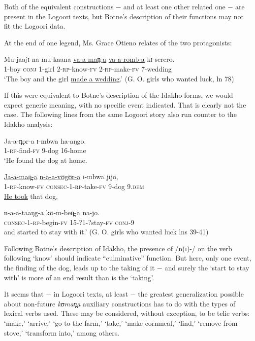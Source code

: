 \documentclass[output=paper]{langsci/langscibook}
\begin{document}
Both of the equivalent constructions $-$ and at least one other related one $-$ are present in the Logoori texts, but Botne’s description of their functions may not fit the Logoori data.

At the end of one legend, Ms. Grace Otieno relates of the two protagonists:

\ea\label{ex:sarvasy:26}
\gll Mu-jaajɪ   na   mu-kaana   \underline{va-a-man̪-a}   \underline{va-a-romb-a}     kɪ-serero. \\
1-boy    \textsc{conj}  1-girl    2-\textsc{rp}{}-know-\textsc{fv}  2-\textsc{rp}-make-\textsc{fv}  7-wedding \\
\glt ‘The boy and the girl \underline{made a wedding}.’ (G. O. girls who wanted luck, ln 78)
\z

If this were equivalent to Botne’s description of the Idakho forms, we would expect generic meaning, with no specific event indicated. That is clearly not the case. The following lines from the same Logoori story also run counter to the Idakho analysis: 

\ea\label{ex:sarvasy:27}
\gll Ja-a-n̪or-a   ɪ{}-mbwa   ha-aŋgo. \\
1-\textsc{rp}{}-find-\textsc{fv}  9-dog    16-home \\
\glt ‘He found the dog at home.

\gll \underline{Ja-a-man̪-a}   \underline{n-a-a-vʊgʊr-a}     ɪ{}-mbwa   jɪjo, \\
1-\textsc{rp}{}-know-\textsc{fv}  \textsc{consec}{}-1-\textsc{rp}{}-take-\textsc{fv}  9-dog    9.\textsc{dem} \\
\glt \underline{He took} that dog,

\gll n-a-a-taaŋg-a       kʊ-m-ben̪-a     na-jo. \\
\textsc{consec}{}-1-\textsc{rp}{}-begin-\textsc{fv}  15-?1-?stay-\textsc{fv}  \textsc{conj}{}-9 \\
\glt and started to stay with it.’ (G. O. girls who wanted luck lns 39-41)
\z 

Following Botne’s description of Idakho, the presence of /n(ɪ)-/ on the verb following ‘know’ should indicate “culminative” function. But here, only one event, the finding of the dog, leads up to the taking of it $-$ and surely the ‘start to stay with’ is more of an end result than is the ‘taking’.

It seems that $-$ in Logoori texts, at least $-$ the greatest generalization possible about non-future \textit{kʊman̪a }auxiliary constructions has to do with the types of lexical verbs used. These may be considered, without exception, to be telic verbs: ‘make,’ ‘arrive,’ ‘go to the farm,’ ‘take,’ ‘make cornmeal,’ ‘find,’ ‘remove from stove,’ ‘transform into,’ among others.
\end{document}

